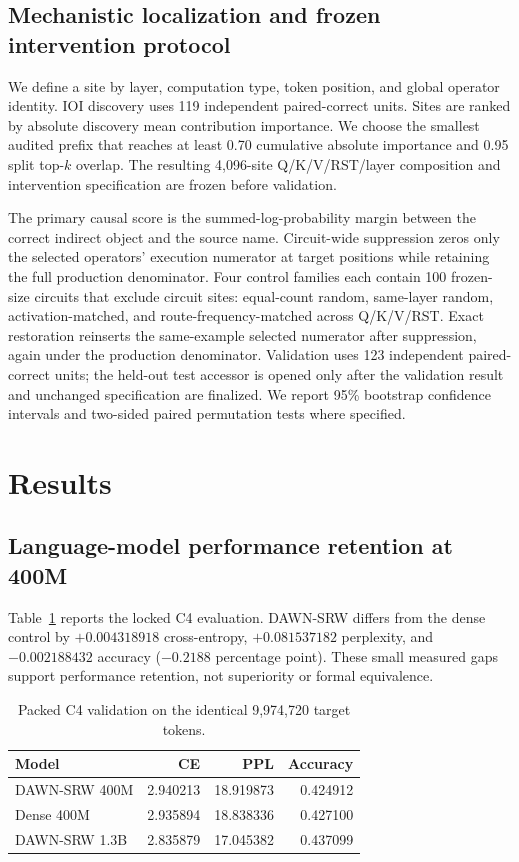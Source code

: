 \documentclass{article}
\newcommand{\DAWN}{DAWN-SRW}
\begin{document}
\subsection{Mechanistic localization and frozen intervention protocol}
\label{sec:protocol}

We define a site by layer, computation type, token position, and global operator
identity.
IOI discovery uses 119 independent paired-correct units. Sites are ranked by
absolute discovery mean contribution importance. We choose the smallest
audited prefix that reaches at least 0.70 cumulative absolute importance and
0.95 split top-\(k\) overlap. The resulting 4,096-site Q/K/V/RST/layer
composition and intervention specification are frozen before validation.

The primary causal score is the summed-log-probability margin between the
correct indirect object and the source name. Circuit-wide suppression zeros
only the selected operators' execution numerator at target positions while
retaining the full production denominator. Four control families each contain
100 frozen-size circuits that exclude circuit sites: equal-count random,
same-layer random, activation-matched, and route-frequency-matched across
Q/K/V/RST. Exact
restoration reinserts the same-example selected numerator after suppression,
again under the production denominator. Validation uses 123 independent
paired-correct units; the held-out test accessor is opened only after the
validation result and unchanged specification are finalized. We report 95\%
bootstrap confidence intervals and two-sided paired permutation tests where
specified.

\section{Results}
\label{sec:results}

\subsection{Language-model performance retention at 400M}

Table~\ref{tab:c4} reports the locked C4 evaluation. \DAWN{} differs from the
dense control by \(+0.004318918\) cross-entropy, \(+0.081537182\) perplexity,
and \(-0.002188432\) accuracy (\(-0.2188\) percentage point). These small
measured gaps support performance retention, not superiority or formal
equivalence.

\begin{table}[t]
\centering
\caption{Packed C4 validation on the identical 9,974,720 target tokens.}
\label{tab:c4}
\small
\begin{tabular}{lrrr}
\toprule
Model & CE & PPL & Accuracy\\
\midrule
\DAWN{} 400M & 2.940213 & 18.919873 & 0.424912\\
Dense 400M & 2.935894 & 18.838336 & 0.427100\\
\DAWN{} 1.3B & 2.835879 & 17.045382 & 0.437099\\
\bottomrule
\end{tabular}
\end{table}
\end{document}
